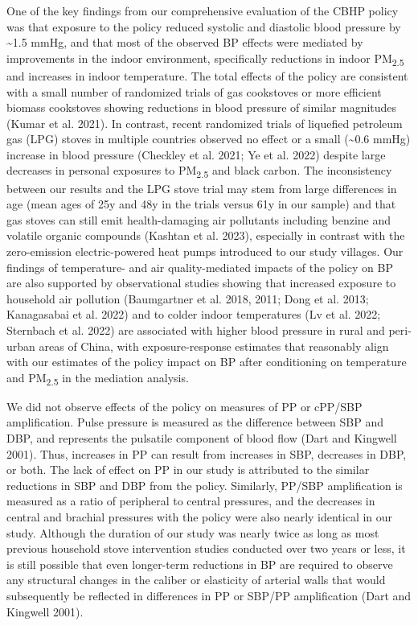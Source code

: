 \documentclass[
  letterpaper,
  DIV=11,
  numbers=noendperiod]{scrartcl}
\begin{document}
One of the key findings from our comprehensive evaluation of the CBHP
policy was that exposure to the policy reduced systolic and diastolic
blood pressure by \textasciitilde1.5 mmHg, and that most of the observed
BP effects were mediated by improvements in the indoor environment,
specifically reductions in indoor PM\textsubscript{2.5} and increases in
indoor temperature. The total effects of the policy are consistent with
a small number of randomized trials of gas cookstoves or more efficient
biomass cookstoves showing reductions in blood pressure of similar
magnitudes (Kumar et al. 2021). In contrast, recent randomized trials of
liquefied petroleum gas (LPG) stoves in multiple countries observed no
effect or a small (\textasciitilde0.6 mmHg) increase in blood pressure
(Checkley et al. 2021; Ye et al. 2022) despite large decreases in
personal exposures to PM\textsubscript{2.5} and black carbon. The
inconsistency between our results and the LPG stove trial may stem from
large differences in age (mean ages of 25y and 48y in the trials versus
61y in our sample) and that gas stoves can still emit health-damaging
air pollutants including benzine and volatile organic compounds (Kashtan
et al. 2023), especially in contrast with the zero-emission
electric-powered heat pumps introduced to our study villages. Our
findings of temperature- and air quality-mediated impacts of the policy
on BP are also supported by observational studies showing that increased
exposure to household air pollution (Baumgartner et al. 2018, 2011; Dong
et al. 2013; Kanagasabai et al. 2022) and to colder indoor temperatures
(Lv et al. 2022; Sternbach et al. 2022) are associated with higher blood
pressure in rural and peri-urban areas of China, with exposure-response
estimates that reasonably align with our estimates of the policy impact
on BP after conditioning on temperature and PM\textsubscript{2.5} in the
mediation analysis.

We did not observe effects of the policy on measures of PP or cPP/SBP
amplification. Pulse pressure is measured as the difference between SBP
and DBP, and represents the pulsatile component of blood flow (Dart and
Kingwell 2001). Thus, increases in PP can result from increases in SBP,
decreases in DBP, or both. The lack of effect on PP in our study is
attributed to the similar reductions in SBP and DBP from the policy.
Similarly, PP/SBP amplification is measured as a ratio of peripheral to
central pressures, and the decreases in central and brachial pressures
with the policy were also nearly identical in our study. Although the
duration of our study was nearly twice as long as most previous
household stove intervention studies conducted over two years or less,
it is still possible that even longer-term reductions in BP are required
to observe any structural changes in the caliber or elasticity of
arterial walls that would subsequently be reflected in differences in PP
or SBP/PP amplification (Dart and Kingwell 2001).
\end{document}

